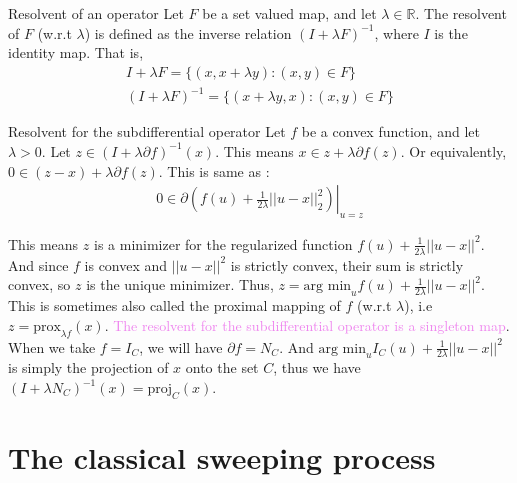 \documentclass[8pt,aspectratio=169]{beamer}
\begin{document}
\begin{frame}[fragile]{Resolvent of an operator}
    Let $F$ be a set valued map, and let $\lambda \in \mathbb{R}$. The resolvent of $F$ (w.r.t $\lambda$) is defined as the inverse relation $(I + \lambda F)^{-1}$, where $I$ is the identity map. That is, 
    \begin{align*}
        I + \lambda F = \{(x, x+\lambda y) : (x, y) \in F\}\\
        (I + \lambda F)^{-1} = \{(x+\lambda y, x) : (x, y) \in F\}
    \end{align*}

    \begin{block}{Resolvent for the subdifferential operator}
        Let $f$ be a convex function, and let $\lambda > 0$. Let $z \in (I + \lambda \partial f)^{-1} (x)$. This means $x \in z + \lambda \partial f(z)$. Or equivalently, $0 \in (z-x) + \lambda \partial f(z)$. This is same as : 
    \begin{align*}
        0 \in \left. \partial \left( f(u)  + \frac{1}{2\lambda} ||u-x||_2^2 \right)\right \vert_{u=z}
    \end{align*}

    This means $z$ is a minimizer for the regularized function $f(u) + \frac{1}{2\lambda}||u-x||^2$. And since $f$ is convex and $||u-x||^2$ is strictly convex, their sum is strictly convex, so $z$ is the unique minimizer. Thus, $z = \text{arg min}_u f(u) + \frac{1}{2\lambda}||u-x||^2$. This is sometimes also called the proximal mapping of $f$ (w.r.t $\lambda$), i.e $z = \text{prox}_{\lambda f}(x)$. \textcolor{violet}{The resolvent for the subdifferential operator is a singleton map}.\\
    
    When we take $f = I_C$, we will have $\partial f = N_C$. And $\text{arg min}_u I_C(u) + \frac{1}{2\lambda}||u-x||^2$ is simply the projection of $x$ onto the set $C$, thus we have $(I + \lambda N_C)^{-1}(x) = \text{proj}_C(x)$.
        
    \end{block}
\end{frame}

\section{The classical sweeping process}
\end{document}
